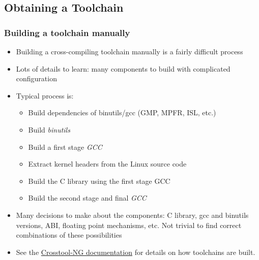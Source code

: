 \subsection{Obtaining a Toolchain}

\begin{frame}
  \frametitle{Building a toolchain manually}

  \begin{itemize}
  \item Building a cross-compiling toolchain manually is a fairly
    difficult process
  \item Lots of details to learn: many components to build with
    complicated configuration
  \item Typical process is:
    \begin{itemize}
    \item Build dependencies of binutils/gcc (GMP, MPFR, ISL, etc.)
    \item Build {\em binutils}
    \item Build a first stage {\em GCC}
    \item Extract kernel headers from the Linux source code
    \item Build the C library using the first stage GCC
    \item Build the second stage and final {\em GCC}
    \end{itemize}
  \item Many decisions to make about the components: C library, gcc
    and binutils versions, ABI, floating point mechanisms, etc. Not
    trivial to find correct combinations of these possibilities
  \item See the
    \href{https://crosstool-ng.github.io/docs/toolchain-construction/}{Crosstool-NG
      documentation} for details on how toolchains are built.
\end{itemize}
\end{frame}


